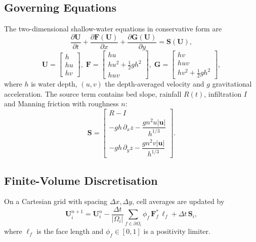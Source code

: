 \documentclass[conference]{IEEEtran}
\begin{document}
\subsection{Governing Equations}
The two-dimensional shallow-water equations in conservative form are
\begin{equation}
\frac{\partial \mathbf{U}}{\partial t} + \frac{\partial \mathbf{F}(\mathbf{U})}{\partial x}
+ \frac{\partial \mathbf{G}(\mathbf{U})}{\partial y} = \mathbf{S}(\mathbf{U}),
\label{eq:swe}
\end{equation}
\begin{equation}
\mathbf{U}=\begin{bmatrix} h\\ hu\\ hv\end{bmatrix},\;
\mathbf{F}=\begin{bmatrix} hu\\ hu^2+\tfrac12 g h^2\\ huv\end{bmatrix},\;
\mathbf{G}=\begin{bmatrix} hv\\ huv\\ hv^2+\tfrac12 g h^2\end{bmatrix},
\end{equation}
where $h$ is water depth, $(u,v)$ the depth-averaged velocity and $g$
gravitational acceleration. The source term contains bed slope, rainfall $R(t)$,
infiltration $I$ and Manning friction with roughness $n$:
\begin{equation}
\mathbf{S}=\begin{bmatrix} R-I\\ -gh\,\partial_x z - \dfrac{g n^2 u\lvert\mathbf{u}\rvert}{h^{1/3}}\\[4pt]
-gh\,\partial_y z - \dfrac{g n^2 v\lvert\mathbf{u}\rvert}{h^{1/3}}\end{bmatrix}.
\end{equation}

\subsection{Finite-Volume Discretisation}
On a Cartesian grid with spacing $\Delta x,\Delta y$, cell averages are
updated by
\begin{equation}
\mathbf{U}_i^{n+1} = \mathbf{U}_i^{n} - \frac{\Delta t}{\lvert\Omega_i\rvert}
\sum_{f\in\partial\Omega_i} \phi_f\,\mathbf{F}^{*}_f\,\ell_f + \Delta t\,\mathbf{S}_i,
\end{equation}
where $\ell_f$ is the face length and $\phi_f\in[0,1]$ is a positivity limiter.
\end{document}
